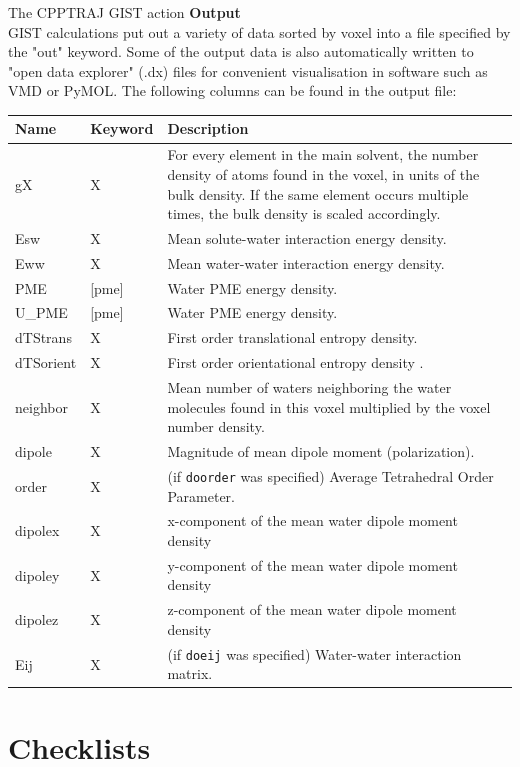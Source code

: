 \documentclass[9pt,tutorial]{livecoms}
\newcommand\inlinecode{\texttt}
\begin{document}
\begin{Checklists*}
\begin{checklist}{The CPPTRAJ GIST action}
\textbf{Output}\\
GIST calculations put out a variety of data sorted by voxel into a file 
specified by the "out" keyword. Some of the output data is also automatically 
written to "open data explorer" (.dx) files for convenient visualisation in 
software such as VMD or PyMOL. The following columns can be found in the output 
file:
\begin{tabular}{@{}l l p{}@{}}
\toprule
Name & Keyword & Description\\
\midrule
gX & X & For every element in the main solvent, the number density of atoms found in the voxel, in units of the bulk density. If the same element occurs multiple times, the bulk density is scaled accordingly. \\
Esw & X &  Mean solute-water interaction energy density. \\
Eww & X & Mean water-water interaction energy density. \\
PME & [pme] & Water PME energy density. \\
U\_PME & [pme] & Water PME energy density. \\
dTStrans & X & First order translational entropy density. \\
dTSorient & X & First order orientational entropy density . \\
neighbor & X & Mean number of waters neighboring the water molecules found in this voxel multiplied by the voxel number density. \\
dipole & X & Magnitude of mean dipole moment (polarization). \\
order & X & (if \inlinecode{doorder} was specified) Average Tetrahedral Order Parameter. \\
dipolex & X & x-component of the mean water dipole moment density \\
dipoley & X & y-component of the mean water dipole moment density \\
dipolez & X & z-component of the mean water dipole moment density \\
Eij & X & (if \inlinecode{doeij} was specified) Water-water interaction matrix. \\
\bottomrule
\end{tabular}
\end{checklist}
\end{Checklists*}

\section{Checklists}
\end{document}
